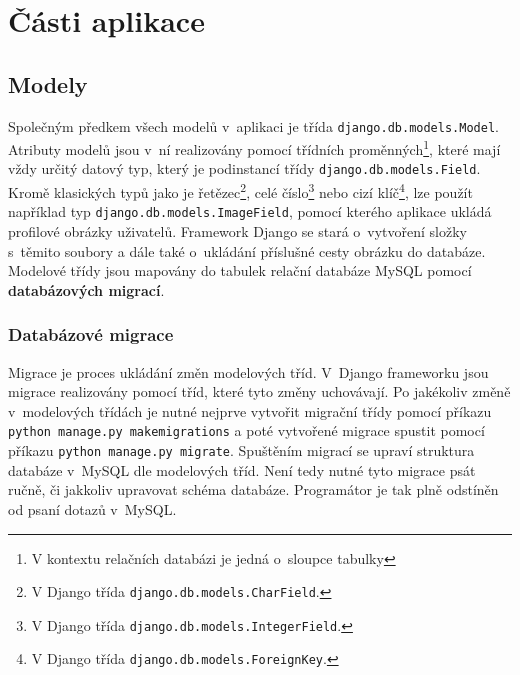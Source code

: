 \section{Části aplikace}

\subsection{Modely}
\begin{sloppypar}
Společným předkem všech modelů v~aplikaci je třída \texttt{django.db.models.Model}. Atributy modelů jsou v~ní realizovány pomocí třídních proměnných\footnote{V kontextu relačních databázi je jedná o~sloupce tabulky}, které mají vždy určitý datový typ, který je podinstancí třídy \texttt{django.db.models.Field}. Kromě klasických typů jako je řetězec\footnote{V Django třída \texttt{django.db.models.CharField}.}, celé číslo\footnote{V Django třída \texttt{django.db.models.IntegerField}.} nebo cizí klíč\footnote{V Django třída \texttt{django.db.models.ForeignKey}.}, lze použít například typ \texttt{django.db.models.ImageField}, pomocí kterého aplikace ukládá profilové obrázky uživatelů. Framework Django se stará o~vytvoření složky s~těmito soubory a dále také o~ukládání příslušné cesty obrázku do databáze. Modelové třídy jsou mapovány do tabulek relační databáze MySQL pomocí \textbf{databázových migrací}.
\end{sloppypar}

\subsubsection{Databázové migrace}
Migrace je proces ukládání změn modelových tříd. V~Django frameworku jsou migrace realizovány pomocí tříd, které tyto změny uchovávají. Po jakékoliv změně v~modelových třídách je nutné nejprve vytvořit migrační třídy pomocí příkazu \mbox{\texttt{python manage.py makemigrations}} a poté vytvořené migrace spustit pomocí příkazu \mbox{\texttt{python manage.py migrate}}. Spuštěním migrací se upraví struktura databáze v~MySQL dle modelových tříd. Není tedy nutné tyto migrace psát ručně, či jakkoliv upravovat schéma databáze. Programátor je tak plně odstíněn od psaní dotazů v~MySQL.

